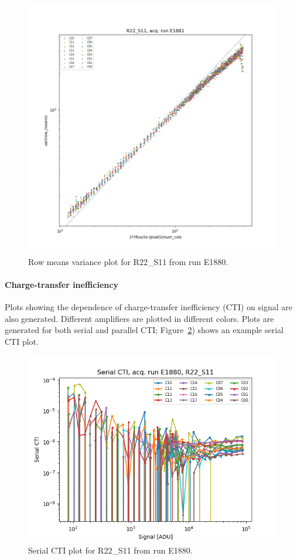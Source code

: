 \begin{figure}
    \centering
    \includegraphics[width=0.8\linewidth]{figures/ReferenceFigures/row_means_variance_plot_LSSTCam_R22_S11_u_lsstccs_eo_ptc_plots_E1881_w_2024_35_20241105T131208Z.png}
    \caption{Row means variance plot for R22\_S11 from run E1880.}
    \label{fig:ref:rowMeansVar}
\end{figure}

\clearpage
\paragraph{Charge-transfer inefficiency}

Plots showing the dependence of charge-transfer inefficiency (CTI) on signal are also generated. Different amplifiers are plotted in different colors. Plots are generated for both serial and parallel CTI; Figure~\ref{fig:ref:scti}) shows an example serial CTI plot.

\begin{figure}
    \centering
    \includegraphics[width=0.8\linewidth]{figures/ReferenceFigures/scti_vs_flux_plot_LSSTCam_R22_S11_u_lsstccs_eo_cti_vs_flux_E1880_w_2024_35_20241101T020455Z.png}
    \caption{Serial CTI plot for R22\_S11 from run E1880.}
    \label{fig:ref:scti}
\end{figure}

